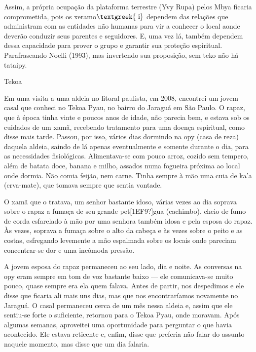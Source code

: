 \documentclass{article}
\begin{document}
Assim, a pr\'opria ocupa\c{c}\~ao da plataforma terrestre (Yvy Rupa)
pelos Mbya ficaria comprometida, pois os xeramo$\text{\textgreek{~i}}$
dependem das rela\c{c}\~oes que administram com as entidades n\~ao
humanas para vir a conhecer o local aonde dever\~ao conduzir seus
parentes e seguidores. E, uma vez l\'a, tamb\'em dependem dessa
capacidade para prover o grupo e garantir sua prote\c{c}\~ao
espiritual. Parafraseando Noelli (1993), mas invertendo sua
proposi\c{c}\~ao, sem teko n\~ao h\'a tataipy.

Tekoa

Em uma visita a uma aldeia no litoral paulista, em 2008, encontrei um
jovem casal que conheci no Tekoa Pyau, no bairro do Jaragu\'a em S\~ao
Paulo. O rapaz, que \`a \'epoca tinha vinte e poucos anos de idade,
n\~ao parecia bem, e estava sob os cuidados de um xam\~a, recebendo
tratamento para uma doen\c{c}a espiritual, como disse mais tarde.
Passou, por isso, v\'arios dias dormindo na opy (casa de reza) daquela
aldeia, saindo de l\'a apenas eventualmente e somente durante o dia,
para as necessidades fisiol\'ogicas. Alimentava-se com pouco arroz,
cozido sem tempero, al\'em de batata doce, banana e milho, assados numa
fogueira pr\'oxima ao local onde dormia. N\~ao comia feij\~ao, nem
carne. Tinha sempre \`a m\~ao uma cuia de ka{\textquoteright}a
(erva-mate), que tomava sempre que sentia vontade. 

O xam\~a que o tratava, um senhor bastante idoso, v\'arias vezes ao dia
soprava sobre o rapaz a fuma\c{c}a de seu grande pet[1EF9?]gua
(cachimbo), cheio de fumo de corda esfarelado \`a m\~ao por uma senhora
tamb\'em idosa e pela esposa do rapaz. \`As vezes, soprava a fuma\c{c}a
sobre o alto da cabe\c{c}a e \`as vezes sobre o peito e as costas,
esfregando levemente a m\~ao espalmada sobre os locais onde pareciam
concentrar-se dor e uma inc\^omoda press\~ao.

A jovem esposa do rapaz permaneceu ao seu lado, dia e noite. As
conversas na opy eram sempre em tom de voz bastante baixo --- ele
comunicava-se muito pouco, quase sempre era ela quem falava. Antes de
partir, nos despedimos e ele disse que ficaria ali mais uns dias, mas
que nos encontrar\'iamos novamente no Jaragu\'a. O casal permaneceu
cerca de um m\^es nessa aldeia e, assim que ele sentiu-se forte o
suficiente, retornou para o Tekoa Pyau, onde moravam. Ap\'os algumas
semanas, aproveitei uma oportunidade para perguntar o que havia
acontecido. Ele estava reticente e, enfim, disse que preferia n\~ao
falar do assunto naquele momento, mas disse que um dia falaria.
\end{document}

